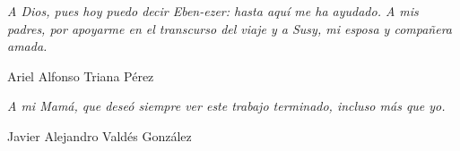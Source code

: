 \begin{dedication}
	
\textit{A Dios, pues hoy puedo decir Eben-ezer: hasta aquí me ha ayudado. A mis padres, por apoyarme en el transcurso del viaje y a Susy, mi esposa y compañera amada.}

\vspace{0.5cm}

Ariel Alfonso Triana Pérez

\vspace{1cm}

\textit{A mi Mamá, que deseó siempre ver este trabajo terminado, incluso más que yo.}

\vspace{0.5cm}

Javier Alejandro Valdés González
\end{dedication}